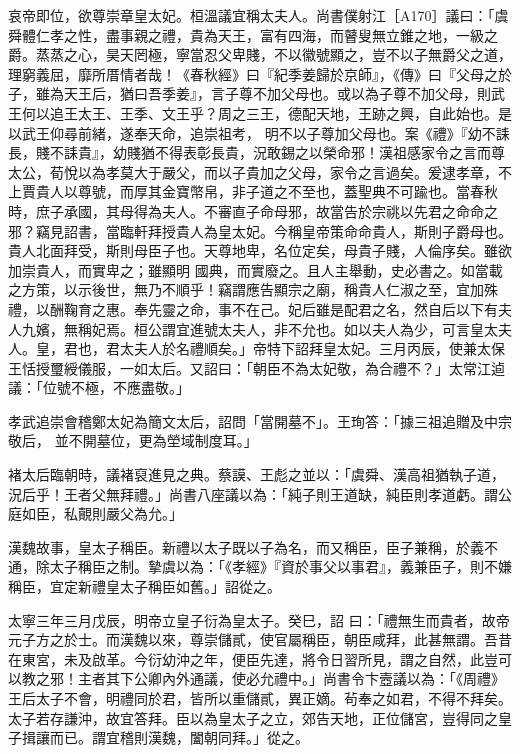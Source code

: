 \begin{pinyinscope}
 哀帝即位，欲尊崇章皇太妃。桓溫議宜稱太夫人。尚書僕射江［A170］議曰：「虞舜體仁孝之性，盡事親之禮，貴為天王，富有四海，而瞽叟無立錐之地，一級之爵。蒸蒸之心，昊天罔極，寧當忍父卑賤，不以徽號顯之，豈不以子無爵父之道，理窮義屈，靡所厝情者哉！《春秋經》曰『紀季姜歸於京師』，《傳》曰『父母之於子，雖為天王后，猶曰吾季姜』，言子尊不加父母也。或以為子尊不加父母，則武王何以追王太王、王季、文王乎？周之三王，德配天地，王跡之興，自此始也。是以武王仰尋前緒，遂奉天命，追崇祖考，
 明不以子尊加父母也。案《禮》『幼不誄長，賤不誄貴』，幼賤猶不得表彰長貴，況敢錫之以榮命邪！漢祖感家令之言而尊太公，荀悅以為孝莫大于嚴父，而以子貴加之父母，家令之言過矣。爰逮孝章，不上賈貴人以尊號，而厚其金寶幣帛，非子道之不至也，蓋聖典不可踰也。當春秋時，庶子承國，其母得為夫人。不審直子命母邪，故當告於宗祧以先君之命命之邪？竊見詔書，當臨軒拜授貴人為皇太妃。今稱皇帝策命命貴人，斯則子爵母也。貴人北面拜受，斯則母臣子也。天尊地卑，名位定矣，母貴子賤，人倫序矣。雖欲加崇貴人，而實卑之；雖顯明
 國典，而實廢之。且人主舉動，史必書之。如當載之方策，以示後世，無乃不順乎！竊謂應告顯宗之廟，稱貴人仁淑之至，宜加殊禮，以酬鞠育之惠。奉先靈之命，事不在己。妃后雖是配君之名，然自后以下有夫人九嬪，無稱妃焉。桓公謂宜進號太夫人，非不允也。如以夫人為少，可言皇太夫人。皇，君也，君太夫人於名禮順矣。」帝特下詔拜皇太妃。三月丙辰，使兼太保王恬授璽綬儀服，一如太后。又詔曰：「朝臣不為太妃敬，為合禮不？」太常江逌議：「位號不極，不應盡敬。」



 孝武追崇會稽鄭太妃為簡文太后，詔問「當開墓不」。王珣答：「據三祖追贈及中宗敬后，
 並不開墓位，更為塋域制度耳。」



 褚太后臨朝時，議褚裒進見之典。蔡謨、王彪之並以：「虞舜、漢高祖猶執子道，況后乎！王者父無拜禮。」尚書八座議以為：「純子則王道缺，純臣則孝道虧。謂公庭如臣，私覿則嚴父為允。」



 漢魏故事，皇太子稱臣。新禮以太子既以子為名，而又稱臣，臣子兼稱，於義不通，除太子稱臣之制。摯虞以為：「《孝經》『資於事父以事君』，義兼臣子，則不嫌稱臣，宜定新禮皇太子稱臣如舊。」詔從之。



 太寧三年三月戊辰，明帝立皇子衍為皇太子。癸巳，詔
 曰：「禮無生而貴者，故帝元子方之於士。而漢魏以來，尊崇儲貳，使官屬稱臣，朝臣咸拜，此甚無謂。吾昔在東宮，未及啟革。今衍幼沖之年，便臣先達，將令日習所見，謂之自然，此豈可以教之邪！主者其下公卿內外通議，使必允禮中。」尚書令卞壼議以為：「《周禮》王后太子不會，明禮同於君，皆所以重儲貳，異正嫡。茍奉之如君，不得不拜矣。太子若存謙沖，故宜答拜。臣以為皇太子之立，郊告天地，正位儲宮，豈得同之皇子揖讓而已。謂宜稽則漢魏，闔朝同拜。」從之。




\end{pinyinscope}

